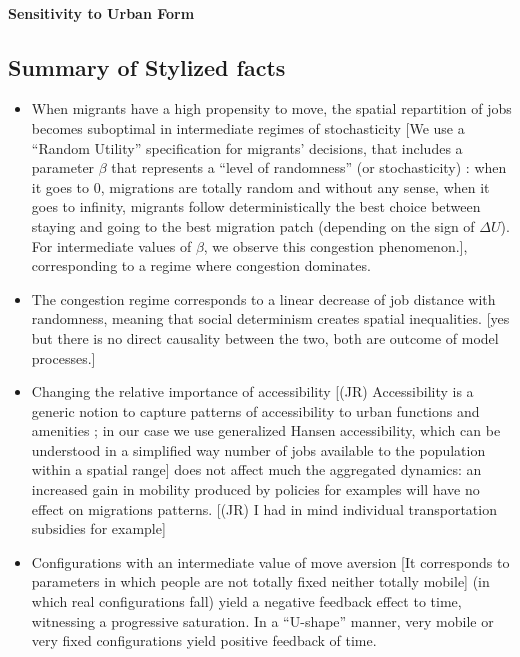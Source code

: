 \paragraph{Sensitivity to Urban Form}





\subsection{Summary of Stylized facts}

\begin{itemize}
\item When migrants have a high propensity to move, the spatial repartition of jobs becomes suboptimal in intermediate regimes of stochasticity [We use a ``Random Utility'' specification for migrants' decisions, that includes a parameter $\beta$ that represents a ``level of randomness'' (or stochasticity) : when it goes to 0, migrations are totally random and without any sense, when it goes to infinity, migrants follow deterministically the best choice between staying and going to the best migration patch (depending on the sign of $\Delta U$). For intermediate values of $\beta$, we observe this congestion phenomenon.], corresponding to a regime where congestion dominates.
\item The congestion regime corresponds to a linear decrease of job distance with randomness, meaning that social determinism creates spatial inequalities. [yes but there is no direct causality between the two, both are outcome of model processes.]
\item Changing the relative importance of accessibility [(JR) Accessibility is a generic notion to capture patterns of accessibility to urban functions and amenities ; in our case we use generalized Hansen accessibility, which can be understood in a simplified way number of jobs available to the population within a spatial range] does not affect much the aggregated dynamics: an increased gain in mobility produced by policies for examples will have no effect on migrations patterns. [(JR) I had in mind individual transportation subsidies for example]
\item Configurations with an intermediate value of move aversion [It corresponds to parameters in which people are not totally fixed neither totally mobile] (in which real configurations fall) yield a negative feedback effect to time, witnessing a progressive saturation. In a ``U-shape'' manner, very mobile or very fixed configurations yield positive feedback of time.

\end{itemize}
